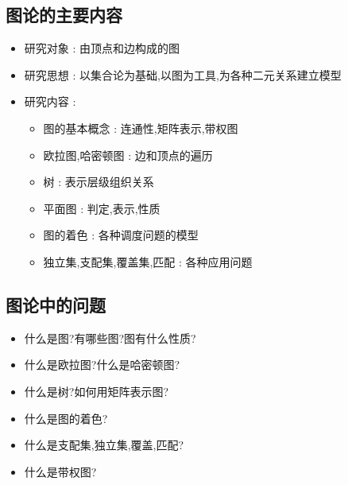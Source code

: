 {{  \subsection{图论的主要内容}{
    \begin{itemize}
      \item 研究对象 : 由顶点和边构成的图
      \item 研究思想 : 以集合论为基础,以图为工具,为各种二元关系建立模型
      \item 研究内容 : \begin{itemize}
              \item 图的基本概念 : 连通性,矩阵表示,带权图
              \item 欧拉图,哈密顿图 : 边和顶点的遍历
              \item 树 : 表示层级组织关系
              \item 平面图 : 判定,表示,性质
              \item 图的着色 : 各种调度问题的模型
              \item 独立集,支配集,覆盖集,匹配 : 各种应用问题
            \end{itemize}
    \end{itemize}
  }%

  \subsection{图论中的问题}{
    \begin{itemize}
      \item 什么是图?有哪些图?图有什么性质?
      \item 什么是欧拉图?什么是哈密顿图?
      \item 什么是树?如何用矩阵表示图?
      \item 什么是图的着色?
      \item 什么是支配集,独立集,覆盖,匹配?
      \item 什么是带权图?
    \end{itemize}
  }%

 }%

}%